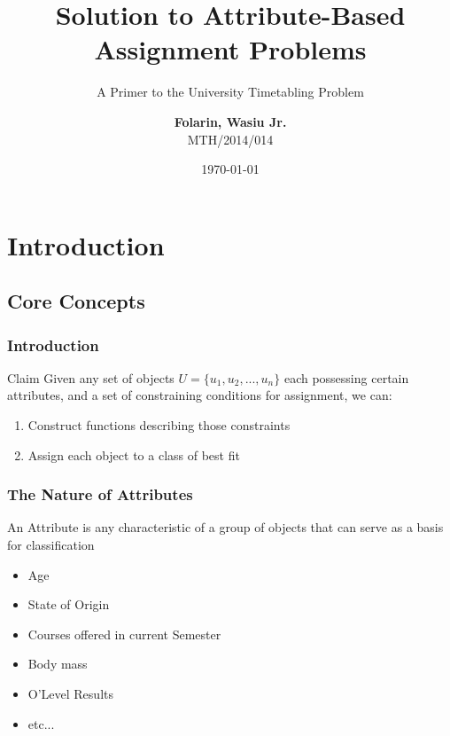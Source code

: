 \documentclass[10pt]{beamer}
\title{Solution to Attribute-Based Assignment Problems}
\subtitle{A Primer to the University Timetabling Problem}
\author{\textbf{Folarin, Wasiu Jr.}\\ MTH/2014/014}
\institute{\textbf{Dr. B. S. Ogundare}\\ \textit{Supervisor}}
\date{\today}
\begin{document}
	\begin{frame}
		\titlepage
	\end{frame}


	\section{Introduction}
		\subsection{Core Concepts}
			\begin{frame}
				\frametitle{Introduction}
				\begin{block}{Claim}
					Given any set of objects $U = \{u_1, u_2,...,u_n\}$ each possessing certain attributes, and a set of constraining conditions for assignment, we can:
					\begin{enumerate}
						\item Construct functions describing those constraints
						\item Assign each object to a class of best fit
					\end{enumerate}
				\end{block}
			\end{frame}
			\begin{frame}
				\frametitle{The Nature of Attributes}
				\begin{definition}
					An Attribute is any characteristic of a group of objects that can serve as a basis for classification
				\end{definition}
				\begin{example}
					\begin{itemize}
						\item Age
						\item State of Origin
						\item Courses offered in current Semester
						\item Body mass
						\item O'Level Results
						\item etc...
					\end{itemize}
				\end{example}
			\end{frame}
\end{document}
